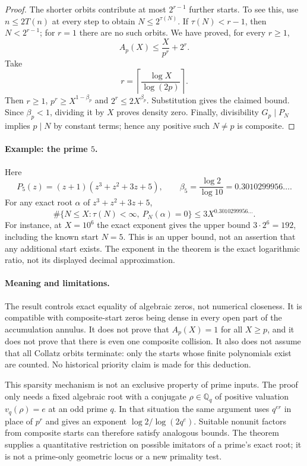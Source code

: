 \documentclass[11pt,a4paper]{article}
\theoremstyle{definition}
\theoremstyle{remark}
\numberwithin{equation}{section}
\begin{document}
\begin{proof}
The shorter orbits contribute at most $2^{r-1}$ further starts.
To see this, use $n\le2T(n)$ at every step to obtain
$N\le2^{\tau(N)}$.  If $\tau(N)<r-1$, then $N<2^{r-1}$;
for $r=1$ there are no such orbits.  We have proved, for every $r\ge1$,
\[
 A_p(X)\le\frac{X}{p^r}+2^r.
\]
Take
\[
 r=\left\lceil\frac{\log X}{\log(2p)}\right\rceil.
\]
Then $r\ge1$, $p^r\ge X^{1-\beta_p}$ and
$2^r\le2X^{\beta_p}$.  Substitution gives the claimed bound.
Since $\beta_p<1$, dividing it by $X$ proves density zero.
Finally, divisibility $G_p\mid P_N$ implies $p\mid N$ by constant
terms; hence any positive such $N\ne p$ is composite.
\end{proof}

\paragraph{Example: the prime $5$.}
Here
\[
 P_5(z)=(z+1)(z^3+z^2+3z+5),\qquad
 \beta_5=\frac{\log2}{\log10}=0.3010299956\ldots.
\]
For any exact root $\alpha$ of $z^3+z^2+3z+5$,
\[
 \#\{N\le X:\tau(N)<\infty,\ P_N(\alpha)=0\}
       \le3X^{0.3010299956\ldots}.
\]
For instance, at $X=10^6$ the exact exponent gives the upper bound
$3\cdot2^6=192$, including the known start $N=5$.
This is an upper bound, not an assertion that any additional start exists.
The exponent in the theorem is the exact logarithmic ratio, not its
displayed decimal approximation.

\paragraph{Meaning and limitations.}
The result controls exact equality of algebraic zeros, not numerical
closeness.  It is compatible with composite-start zeros being dense in
every open part of the accumulation annulus.  It does not prove that
$A_p(X)=1$ for all $X\ge p$, and it does not prove that there is even
one composite collision.  It also does not assume that all Collatz
orbits terminate: only the starts whose finite polynomials exist are
counted.  No historical priority claim is made for this deduction.

This sparsity mechanism is not an exclusive property of prime inputs.
The proof only needs a fixed algebraic root with a conjugate
$\rho\in\mathbb Q_q$ of positive valuation $v_q(\rho)=e$ at an odd
prime $q$.  In that situation the same argument uses $q^{er}$ in place
of $p^r$ and gives an exponent $\log2/\log(2q^e)$.
Suitable nonunit factors from composite starts can therefore satisfy
analogous bounds.  The theorem supplies a quantitative restriction on
possible imitators of a prime's exact root; it is not a prime-only
geometric locus or a new primality test.
\end{document}
